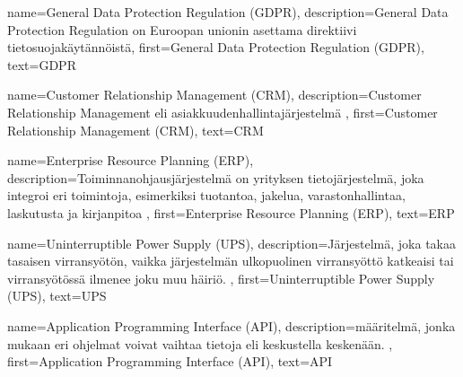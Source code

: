 %
%
%

\makeglossaries


    {
    name={General Data Protection Regulation (GDPR)},
	description={General Data Protection Regulation on Euroopan unionin asettama direktiivi tietosuojakäytännöistä},
	first={General Data Protection Regulation (GDPR)},
	text={GDPR}
    }

    {
	name={Customer Relationship Management (CRM)},
	description={Customer Relationship Management eli asiakkuudenhallintajärjestelmä \cite{crm, crm2}},
	first={Customer Relationship Management (CRM)},
	text={CRM}
    }

    {
    name={Enterprise Resource Planning (ERP)},
    description={Toiminnanohjausjärjestelmä on yrityksen tietojärjestelmä, joka integroi eri toimintoja, esimerkiksi tuotantoa, jakelua, varastonhallintaa, laskutusta ja kirjanpitoa \cite{erp}},
    first={Enterprise Resource Planning (ERP)},
    text={ERP}
    }

    {
    name={Uninterruptible Power Supply (UPS)},
    description={Järjestelmä, joka takaa tasaisen virransyötön, vaikka järjestelmän ulkopuolinen virransyöttö katkeaisi tai virransyötössä ilmenee joku muu häiriö. \cite{ups}},
    first={Uninterruptible Power Supply (UPS)},
    text={UPS}
    }

    {
    name={Application Programming Interface (API)},
    description={määritelmä, jonka mukaan eri ohjelmat voivat vaihtaa tietoja eli keskustella keskenään. \cite{api}},
    first={Application Programming Interface (API)},
    text={API}
    }

